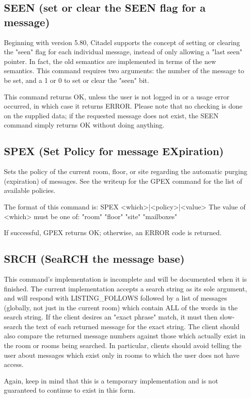 \subsection{SEEN (set or clear the SEEN flag for a message)}

 Beginning with version 5.80, Citadel supports the concept of setting or
clearing the "seen" flag for each individual message, instead of only allowing
a "last seen" pointer.  In fact, the old semantics are implemented in terms
of the new semantics.  This command requires two arguments: the number of the
message to be set, and a 1 or 0 to set or clear the "seen" bit.

 This command returns OK, unless the user is not logged in or a usage error
occurred, in which case it returns ERROR.  Please note that no checking is
done on the supplied data; if the requested message does not exist, the SEEN
command simply returns OK without doing anything.



\subsection{SPEX (Set Policy for message EXpiration)}

 Sets the policy of the current room, floor, or site regarding the automatic
purging (expiration) of messages.  See the writeup for the GPEX command for
the list of available policies.

 The format of this command is:  SPEX <which>|<policy>|<value>
 The value of <which> must be one of: "room" "floor" "site" "mailboxes"

 If successful, GPEX returns OK; otherwise, an ERROR code is returned.



\subsection{SRCH (SeaRCH the message base)}

 This command's implementation is incomplete and will be documented when it
is finished.  The current implementation accepts a search string as its sole
argument, and will respond with LISTING_FOLLOWS followed by a list of
messages (globally, not just in the current room) which contain ALL of the
words in the search string.  If the client desires an "exact phrase" match,
it must then slow-search the text of each returned message for the exact
string.  The client should also compare the returned message numbers against
those which actually exist in the room or rooms being searched.  In
particular, clients should avoid telling the user about messages which exist
only in rooms to which the user does not have access.

 Again, keep in mind that this is a temporary implementation and is not
guaranteed to continue to exist in this form.


